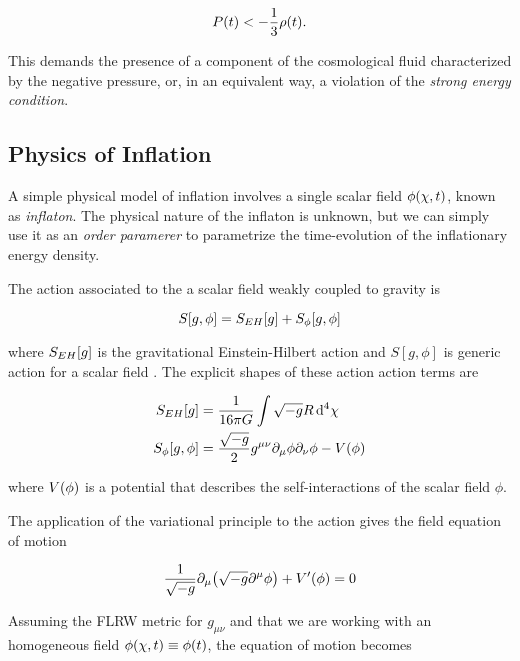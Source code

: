 \begin{equation}
        P\qty(t) < -\frac{1}{3} \rho\qty(t).
\end{equation}

This demands the presence of a component of the cosmological fluid
characterized by the negative pressure, or, in an equivalent way, a
violation of the \emph{strong energy condition}.

\subsection{Physics of Inflation}

A simple physical model of inflation involves a single scalar field
$\phi\qty(\vb{\chi},t)$, known as \emph{inflaton}. The physical nature of
the inflaton is unknown, but we can simply use it as an \emph{order
paramerer} to parametrize the time-evolution of the inflationary energy
density.

The action associated to the a scalar field weakly coupled to gravity is

\begin{equation}
        S\qty[g,\phi] = S_{EH}\qty[g] + S_\phi\qty[g,\phi]
\end{equation}

where $S_{EH}\qty[g]$ is the gravitational Einstein-Hilbert action and
$S[g,\phi]$ is generic action for a scalar field
\autocite{baumann2009tasi}. The explicit shapes of these action action
terms are

\begin{align}
        S_{EH}[g] & = \frac{1}{16\pi G} \int \sqrt{-g} R \dd[4]{\chi} \\
        S_\phi[g,\phi] & = \frac{\sqrt{-g}}{2}
        g^{\mu \nu}\partial_\mu\phi\partial_\nu\phi - V\qty(\phi)
\end{align}

where $V\qty(\phi)$ is a potential that describes the self-interactions of
the scalar field $\phi$.

The application of the variational principle to the action gives the
field equation of motion

\begin{equation}
        \frac{1}{\sqrt{-g}} \partial_\mu\qty(\sqrt{-g} \partial^\mu\phi) +
        V'\qty(\phi) = 0
\end{equation}

Assuming the FLRW metric for $g_{\mu \nu}$ and that we are working with an
homogeneous field $\phi\qty(\vb{\chi},t) \equiv \phi\qty(t)$, the equation
of motion becomes

